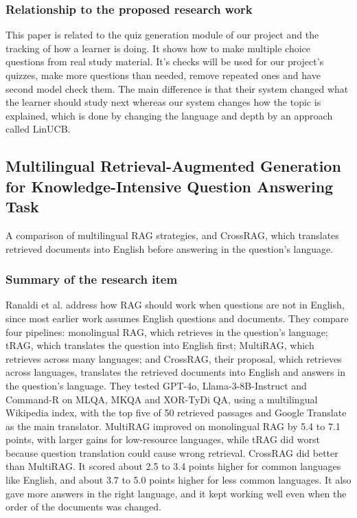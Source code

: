 \documentclass{FastFyp}
\begin{document}
\subsubsection{Relationship to the proposed research work}
This paper is related to the quiz generation module of our project and the tracking of how a learner is doing. It shows how to make multiple choice questions from real study material. It's checks will be used for our project's quizzes, make more questions than needed, remove repeated ones and have second model check them. The main difference is that their system changed what the learner should study next whereas our system changes how the topic is explained, which is done by changing the language and depth by an approach called LinUCB.


\subsection{Multilingual Retrieval-Augmented Generation for Knowledge-Intensive Question Answering Task}
A comparison of multilingual RAG strategies, and CrossRAG, which translates retrieved documents into English before answering in the question's language.


\subsubsection{Summary of the research item}
Ranaldi et al. \cite{ranaldi2026multilingual} address how RAG should work when questions are not in English, since most earlier work assumes English questions and documents. They compare four pipelines: monolingual RAG, which retrieves in the question's language; tRAG, which translates the question into English first; MultiRAG, which retrieves across many languages; and CrossRAG, their proposal, which retrieves across languages, translates the retrieved documents into English and answers in the question's language. They tested GPT-4o, Llama-3-8B-Instruct and Command-R on MLQA, MKQA and XOR-TyDi QA, using a multilingual Wikipedia index, with the top five of 50 retrieved passages and Google Translate as the main translator. MultiRAG improved on monolingual RAG by 5.4 to 7.1 points, with larger gains for low-resource languages, while tRAG did worst because question translation could cause wrong retrieval. CrossRAG did better than MultiRAG. It scored about 2.5 to 3.4 points higher for common languages like English, and about 3.7 to 5.0 points higher for less common languages. It also gave more answers in the right language, and it kept working well even when the order of the documents was changed.
\end{document}
